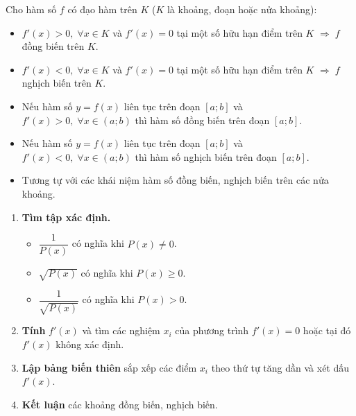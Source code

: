 \documentclass[12pt,a4paper]{article}
\begin{document}
\begin{dinhly}[title={Tổng quát}]
  Cho hàm số $f$ có đạo hàm trên $K$ ($K$ là khoảng, đoạn hoặc nửa khoảng):
  \begin{itemize}
    \item $f'(x) > 0,\;\forall x \in K$ và $f'(x) = 0$ tại một số hữu hạn điểm trên $K$ $\Rightarrow\; f$ đồng biến trên $K$.
    \item $f'(x) < 0,\;\forall x \in K$ và $f'(x) = 0$ tại một số hữu hạn điểm trên $K$ $\Rightarrow\; f$ nghịch biến trên $K$.
  \end{itemize}
\end{dinhly}

\begin{luuy}
  \begin{itemize}
    \item Nếu hàm số $y = f(x)$ liên tục trên đoạn $[a; b]$ và $f'(x) > 0,\;\forall x \in (a; b)$ thì hàm số đồng biến trên đoạn $[a; b]$.
    \item Nếu hàm số $y = f(x)$ liên tục trên đoạn $[a; b]$ và $f'(x) < 0,\;\forall x \in (a; b)$ thì hàm số nghịch biến trên đoạn $[a; b]$.
    \item Tương tự với các khái niệm hàm số đồng biến, nghịch biến trên các nửa khoảng.
  \end{itemize}
\end{luuy}

\begin{phuongphap}[title={Các bước xét tính đơn điệu}]
  \begin{enumerate}
    \item \textbf{Tìm tập xác định.}
      \begin{itemize}
        \item $\dfrac{1}{P(x)}$ có nghĩa khi $P(x) \ne 0$.
        \item $\sqrt{P(x)}$ có nghĩa khi $P(x) \ge 0$.
        \item $\dfrac{1}{\sqrt{P(x)}}$ có nghĩa khi $P(x) > 0$.
      \end{itemize}
    \item \textbf{Tính} $f'(x)$ và tìm các nghiệm $x_i$ của phương trình $f'(x) = 0$ hoặc tại đó $f'(x)$ không xác định.
    \item \textbf{Lập bảng biến thiên} sắp xếp các điểm $x_i$ theo thứ tự tăng dần và xét dấu $f'(x)$.
    \item \textbf{Kết luận} các khoảng đồng biến, nghịch biến.
  \end{enumerate}
\end{phuongphap}
\end{document}
